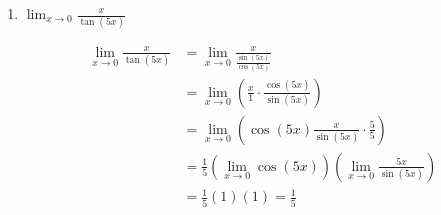 \documentclass[handout,nooutcomes]{ximera}
\begin{document}
\begin{problem}
\begin{enumerate}
	\item  $\lim_{x \to 0} \frac{x}{\tan(5x)}$
			\begin{freeResponse}
			\begin{align*}
			\lim_{x \to 0} \frac{x}{\tan(5x)} &= \lim_{x \to 0} \frac{x}{\frac{\sin(5x)}{\cos(5x)}}  \\
			&= \lim_{x \to 0} \left( \frac{x}{1} \cdot \frac{\cos(5x)}{\sin(5x)} \right)  \\
			&= \lim_{x \to 0} \left( \cos(5x) \frac{x}{\sin(5x)} \cdot \frac{5}{5} \right)  \\
			&= \frac{1}{5} \left( \lim_{x \to 0} \cos(5x) \right) \left( \lim_{x \to 0} \frac{5x}{\sin(5x)} \right)  \\
			&= \frac{1}{5} (1) (1) = \frac{1}{5}
			\end{align*}
			\end{freeResponse}
			
			
			
	\end{enumerate}
\end{problem}
	
	
	
	
			
			
\end{document}
